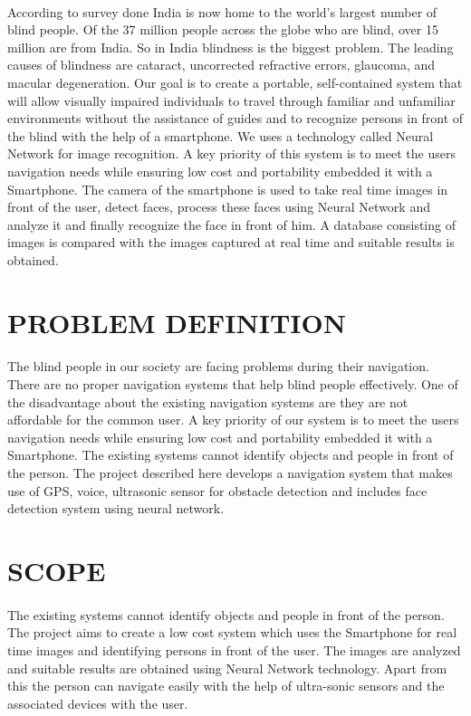 \documentclass[11pt,a4paper,twoside]{report}
\begin{document}
\paragraph{ }According to survey done India is now home to the world’s largest number of blind people. Of the 37 million people across the globe who are blind, over 15 million are from India. So in India blindness is the biggest problem. The leading causes of blindness are cataract, uncorrected refractive errors, glaucoma, and macular degeneration. Our goal is to create a portable, self-contained system that will allow visually impaired individuals to travel through familiar and unfamiliar environments without the assistance of guides and to recognize persons in front of the blind with the help of a smartphone. We uses a technology called Neural Network for image recognition. A key priority of this system is to meet the users navigation needs while ensuring low cost and portability embedded it with a Smartphone. The camera of the smartphone  is used to take real time images in front of the user, detect faces, process these faces using Neural Network and analyze it and finally recognize the face in front of him. A database consisting of images  is compared with the images captured at real time and suitable results is obtained.
\section{PROBLEM DEFINITION}
\paragraph{ } The blind people in our society are facing problems during their navigation. There are no proper navigation systems that help blind people effectively. One of the disadvantage about the existing navigation systems are they are not affordable for the common user. A key priority of our system is to meet the users navigation needs while ensuring low cost and portability embedded it with a Smartphone.  The existing systems cannot identify objects and people in front of the person. The project described here develops a navigation system that makes use of GPS, voice, ultrasonic sensor for obstacle detection and includes face detection system using neural network.
\newpage
\section{SCOPE}
\paragraph{ }The existing systems cannot identify objects and people in front of the person. The project aims to create a low cost system which uses the Smartphone for real time images and identifying persons in front of the user. The images are analyzed and suitable results are obtained using Neural Network technology. Apart from this the person can navigate easily with the help of ultra-sonic sensors and the associated devices with the user.
\end{document}
